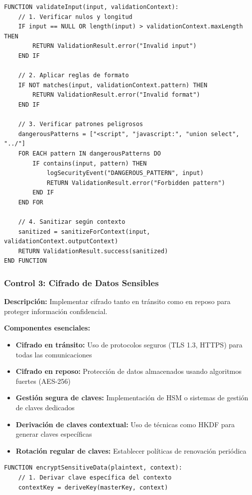 {\begin{lstlisting}[language=pseudocode, caption=Framework de validación de entrada]
FUNCTION validateInput(input, validationContext):
    // 1. Verificar nulos y longitud
    IF input == NULL OR length(input) > validationContext.maxLength THEN
        RETURN ValidationResult.error("Invalid input")
    END IF
    
    // 2. Aplicar reglas de formato
    IF NOT matches(input, validationContext.pattern) THEN
        RETURN ValidationResult.error("Invalid format")
    END IF
    
    // 3. Verificar patrones peligrosos
    dangerousPatterns = ["<script", "javascript:", "union select", "../"]
    FOR EACH pattern IN dangerousPatterns DO
        IF contains(input, pattern) THEN
            logSecurityEvent("DANGEROUS_PATTERN", input)
            RETURN ValidationResult.error("Forbidden pattern")
        END IF
    END FOR
    
    // 4. Sanitizar según contexto
    sanitized = sanitizeForContext(input, validationContext.outputContext)
    RETURN ValidationResult.success(sanitized)
END FUNCTION
\end{lstlisting}

\subsubsection{Control 3: Cifrado de Datos Sensibles}

\textbf{Descripción:} Implementar cifrado tanto en tránsito como en reposo para proteger información confidencial.

\textbf{Componentes esenciales:}
\begin{itemize}
    \item \textbf{Cifrado en tránsito:} Uso de protocolos seguros (TLS 1.3, HTTPS) para todas las comunicaciones
    \item \textbf{Cifrado en reposo:} Protección de datos almacenados usando algoritmos fuertes (AES-256)
    \item \textbf{Gestión segura de claves:} Implementación de HSM o sistemas de gestión de claves dedicados
    \item \textbf{Derivación de claves contextual:} Uso de técnicas como HKDF para generar claves específicas
    \item \textbf{Rotación regular de claves:} Establecer políticas de renovación periódica
\end{itemize}

\begin{lstlisting}[language=pseudocode, caption=Cifrado de datos sensibles]
FUNCTION encryptSensitiveData(plaintext, context):
    // 1. Derivar clave específica del contexto
    contextKey = deriveKey(masterKey, context)
    

\end{lstlisting}}
